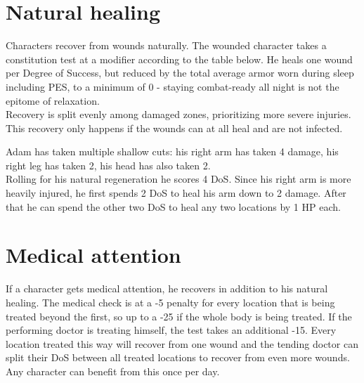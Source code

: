 \documentclass[12pt,a4paper,openany,dvipsnames]{book}
\begin{document}
	\section{Natural healing}
	Characters recover from wounds naturally. The wounded character takes a constitution test at a modifier according to the table below. He heals one wound per Degree of Success, but reduced by the total average armor worn during sleep including PES, to a minimum of 0 - staying combat-ready all night is not the epitome of relaxation.\\
	Recovery is split evenly among damaged zones, prioritizing more severe injuries. This recovery only happens if the wounds can at all heal and are not infected.
	\begin{exampleblock}
		Adam has taken multiple shallow cuts:
			his right arm has taken 4 damage,
			his right leg has taken 2,
			his head has also taken 2.
		\\%
		Rolling for his natural regeneration he scores 4 DoS.
		Since his right arm is more heavily injured,
			he first spends 2 DoS to heal his arm down to 2 damage.
		After that he can spend the other two DoS to heal
			any two locations
			by 1 HP each.
	\end{exampleblock}
	\section{Medical attention}
	If a character gets medical attention, he recovers in addition to his natural healing. The medical check is at a -5 penalty for every location that is being treated beyond the first, so up to a -25 if the whole body is being treated. If the performing doctor is treating himself, the test takes an additional \mbox{-15}. %
	Every location treated this way will recover from one wound and the tending doctor can split their DoS between all treated locations to recover from even more wounds. Any character can benefit from this once per day.
\end{document}
